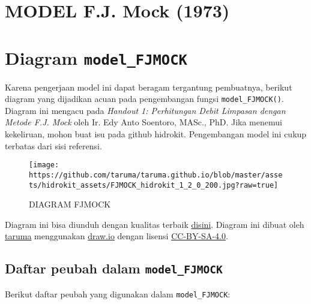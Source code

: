 \documentclass[11pt]{article}
\begin{document}
    \hypertarget{model-f.j.-mock-1973}{%
\section{MODEL F.J. Mock (1973)}\label{model-f.j.-mock-1973}}

    \hypertarget{diagram-model_fjmock}{%
\section{\texorpdfstring{Diagram
\texttt{model\_FJMOCK}}{Diagram model\_FJMOCK}}\label{diagram-model_fjmock}}

Karena pengerjaan model ini dapat beragam tergantung pembuatnya, berikut
diagram yang dijadikan acuan pada pengembangan fungsi
\texttt{model\_FJMOCK()}. Diagram ini mengacu pada \emph{Handout 1:
Perhitungan Debit Limpasan dengan Metode F.J. Mock} oleh Ir. Edy Anto
Soentoro, MASc., PhD. Jika menemui kekeliruan, mohon buat isu pada
github hidrokit. Pengembangan model ini cukup terbatas dari sisi
referensi.

\begin{figure}
\centering
\texttt{[image: https://github.com/taruma/taruma.github.io/blob/master/assets/hidrokit\_assets/FJMOCK\_hidrokit\_1\_2\_0\_200.jpg?raw=true]}
\caption{DIAGRAM FJMOCK}
\end{figure}

Diagram ini bisa diunduh dengan kualitas terbaik
\href{https://github.com/taruma/taruma.github.io/blob/master/assets/hidrokit_assets/FJMOCK_hidrokit_1_2_0_1000.jpg?raw=true}{disini}.
Diagram ini dibuat oleh \href{https://taruma.github.io}{taruma}
menggunakan \href{https://www.draw.io}{draw.io} dengan lisensi
\href{https://creativecommons.org/licenses/by-sa/4.0/}{CC-BY-SA-4.0}.

    \hypertarget{daftar-peubah-dalam-model_fjmock}{%
\subsection{\texorpdfstring{Daftar peubah dalam
\texttt{model\_FJMOCK}}{Daftar peubah dalam model\_FJMOCK}}\label{daftar-peubah-dalam-model_fjmock}}

Berikut daftar peubah yang digunakan dalam \texttt{model\_FJMOCK}:
\end{document}
